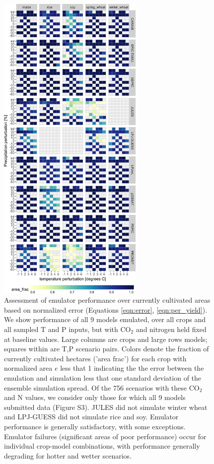 \documentclass[esd, manuscript]{copernicus} %
\begin{document}
\begin{figure}[ht]
\centering
    \includegraphics[width=7cm]{figures/error_360.png}
    \caption{Assessment of emulator performance over currently cultivated areas based on normalized error (Equations \ref{eqn:error}, \ref{eqn:per_yield}). We show performance of all 9 models emulated, over all crops and all sampled T and P inputs, but with CO$_2$ and nitrogen held fixed at baseline values. Large columns are crops and large rows models; squares within are T,P scenario pairs. Colors denote the fraction of currently cultivated hectares ('area frac') for each crop with normalized area $e$ less that 1 indicating the the error between the emulation and simulation less that one standard deviation of the ensemble simulation spread. Of the 756 scenarios with these CO$_2$ and N values, we consider only those for which all 9 models submitted data (Figure S3). JULES did not simulate winter wheat and LPJ-GUESS did not simulate rice and soy. Emulator performance is generally satisfactory, with some exceptions. Emulator failures (significant areas of poor performance) occur for individual crop-model combinations, with performance generally degrading for hotter and wetter scenarios.}
   \label{fig:error_360}
\end{figure}
\end{document}
